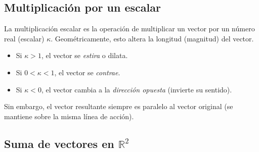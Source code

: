 \subsection{Multiplicación por un escalar}

La multiplicación escalar es la operación de multiplicar un vector por un número real (escalar) $\kappa$. Geométricamente, esto altera la longitud (magnitud) del vector. 
\begin{itemize}
    \item Si $\kappa > 1$, el vector se \textit{estira} o dilata.
    \item Si $0 < \kappa < 1$, el vector se \textit{contrae}.
    \item Si $\kappa < 0$, el vector cambia a la \textit{dirección opuesta} (invierte su sentido).
\end{itemize}
Sin embargo, el vector resultante siempre es paralelo al vector original (se mantiene sobre la misma línea de acción).

\begin{center}
\shorthandoff{>}
\end{center}

\subsection{Suma de vectores en $\mathbb{R}^2$}

